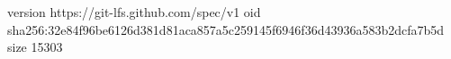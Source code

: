 version https://git-lfs.github.com/spec/v1
oid sha256:32e84f96be6126d381d81aca857a5c259145f6946f36d43936a583b2dcfa7b5d
size 15303

